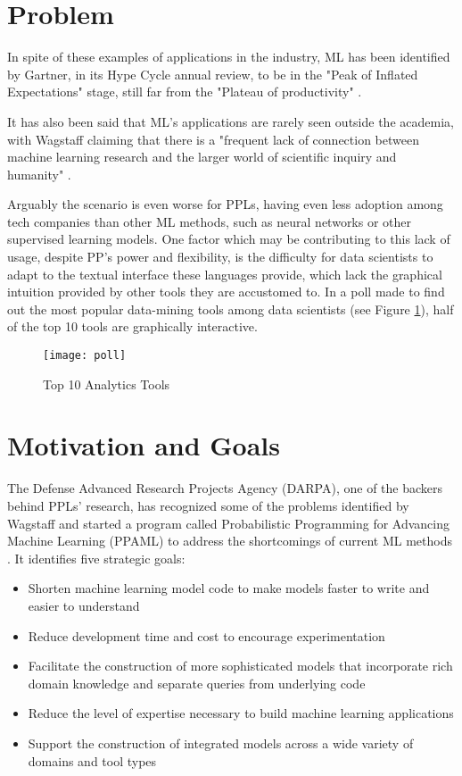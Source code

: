 \section{Problem} \label{sec:proj}

In spite of these examples of applications in the industry, ML has been
identified by Gartner, in its Hype Cycle annual review,
to be in the "Peak of Inflated Expectations" stage, still far
from the "Plateau of productivity" \cite{gartner}.

It has also been said that ML's applications are rarely seen
outside the academia, with Wagstaff claiming that there is a "frequent lack of
connection between machine learning research and the larger world of scientific
inquiry and humanity" \cite{Wagstaff2012}.

Arguably the scenario is even worse for PPLs, having even less adoption
among tech companies than other ML methods, such as neural networks or other
supervised learning models. One factor which may be contributing to this lack of
usage, despite PP's power and flexibility, is the difficulty for data scientists
to adapt to the textual interface these languages provide, which lack the graphical
intuition provided by other tools they are accustomed to. In a poll made to find
out the most popular data-mining tools among data scientists
(see Figure \ref{fig:poll}), half of the top 10 tools are
graphically interactive.

\begin{figure}[t]
  \begin{center}
    \leavevmode
    \texttt{[image: poll]}
    \caption{Top 10 Analytics Tools \cite{kdn}}
    \label{fig:poll}
  \end{center}
\end{figure}

\section{Motivation and Goals} \label{sec:goals}

The Defense Advanced Research Projects Agency (DARPA), one of the backers behind
PPLs' research, has recognized some of the problems
identified by Wagstaff and started a program called Probabilistic Programming
for Advancing Machine Learning (PPAML) to address the shortcomings of
current ML methods \cite{darpa}. It identifies five strategic goals:

\begin{itemize}
  \item Shorten machine learning model code to make models faster to write and
  easier to understand
  \item Reduce development time and cost to encourage experimentation
  \item Facilitate the construction of more sophisticated models that
  incorporate rich domain knowledge and separate queries from underlying code
  \item Reduce the level of expertise necessary to build machine learning
  applications
  \item Support the construction of integrated models across a wide variety of
  domains and tool types
\end{itemize}

